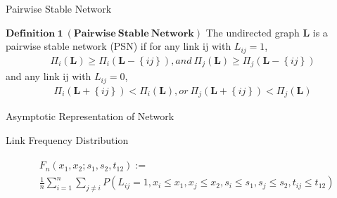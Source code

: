 \documentclass{beamer}		%
\begin{document}
\begin{frame}{Pairwise Stable Network}

$\bm{Definition\ 1\ (Pairwise\ Stable\ Network)}$ The undirected graph $\bm{L}$ is a pairwise
stable network (PSN) if for any link ij with $L_{ij}=1$,
\begin{align*}
    \Pi_i(\bm{L}) \ge \Pi_i(\bm{L} - \left\{ ij \right\}), and\ \Pi_j(\bm{L}) \ge \Pi_j(\bm{L} - \left\{ ij \right\})
\end{align*}
and any link ij with $L_{ij}=0$,
\begin{align*}
     \Pi_i(\bm{L} + \left\{ ij \right\}) < \Pi_i(\bm{L}), or\ \Pi_j(\bm{L} + \left\{ ij \right\}) < \Pi_j(\bm{L}) 
\end{align*}



\end{frame}








\begin{frame}[noframenumbering]

\begin{itemize}

    \begin{LARGE}
    
    \item {}
    
    \item {}
    
    \item Asymptotic Representation of Network
    
    \item {}

    \end{LARGE}
    
\end{itemize}
	
\end{frame}









\begin{frame}{Link Frequency Distribution}

\begin{align}
\begin{split}
    & F_n(x_1, x_2; s_1, s_2, t_{12}):= \\
    & \frac{1}{n} \sum_{i=1}^n \sum_{j \ne i} P(L_{ij}=1, x_i \leq x_1, x_j \leq x_2, s_i \leq s_1 , s_j \leq s_2, t_{ij} \leq t_{12} )
\end{split}
\end{align}




\end{frame}
\end{document}
